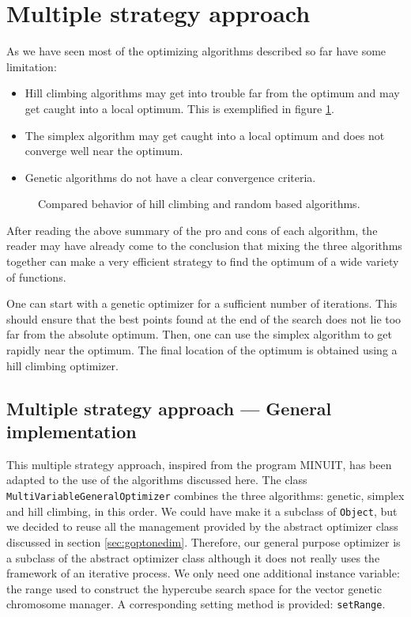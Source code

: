 \documentclass[twoside]{book}
\begin{document}
\section{Multiple strategy approach}
\label{sec:multistrategy} As we have seen most of the optimizing
algorithms described so far have some limitation:
\begin{itemize}
  \item Hill climbing algorithms may get into trouble far from the
  optimum and may get caught into a local optimum. This is exemplified in figure \ref{fig:hillvsrandom}.
  \item The simplex algorithm may get caught into a local optimum
  and does not converge well near the optimum.
  \item Genetic algorithms do not have a clear convergence
  criteria.
\end{itemize}
\begin{figure}
\center{} \caption{Compared behavior of hill climbing and random
based algorithms.}\label{fig:hillvsrandom}
\end{figure}
After reading the above summary of the pro and cons of each
algorithm, the reader may have already come to the conclusion that
mixing the three algorithms together can make a very efficient
strategy to find the optimum of a wide variety of functions.

One can start with a genetic optimizer for a sufficient number of
iterations. This should ensure that the best points found at the
end of the search does not lie too far from the absolute optimum.
Then, one can use the simplex algorithm to get rapidly near the
optimum. The final location of the optimum is obtained using a
hill climbing optimizer.

\subsection{Multiple strategy approach --- General implementation}
This multiple strategy approach, inspired from the program MINUIT,
has been adapted to the use of the algorithms discussed here. The
class {\tt MultiVariableGeneralOptimizer} combines the three
algorithms: genetic, simplex and hill climbing, in this order. We
could have make it a subclass of {\tt Object}, but we decided to
reuse all the management provided by the abstract optimizer class
discussed in section \ref{sec:goptonedim}. Therefore, our general
purpose optimizer is a subclass of the abstract optimizer class
although it does not really uses the framework of an iterative
process. We only need one additional instance variable: the range
used to construct the hypercube search space for the vector
genetic chromosome manager. A corresponding setting method is
provided: {\tt setRange}.
\end{document}

